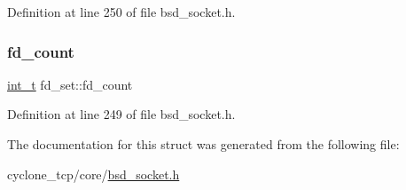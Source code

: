 Definition at line 250 of file bsd\+\_\+socket.\+h.

\mbox{\label{structfd__set_a7f64eb4ba04934ec80743cc4ecf006ec}} 
\subsubsection{\texorpdfstring{fd\+\_\+count}{fd\_count}}
{\footnotesize\ttfamily \hyperlink{compiler__port_8h_a022c65af7f6c8d3947e8a37d64db6ad6}{int\+\_\+t} fd\+\_\+set\+::fd\+\_\+count}



Definition at line 249 of file bsd\+\_\+socket.\+h.



The documentation for this struct was generated from the following file\+:\begin{DoxyCompactItemize}
\item 
cyclone\+\_\+tcp/core/\hyperlink{bsd__socket_8h}{bsd\+\_\+socket.\+h}\end{DoxyCompactItemize}
